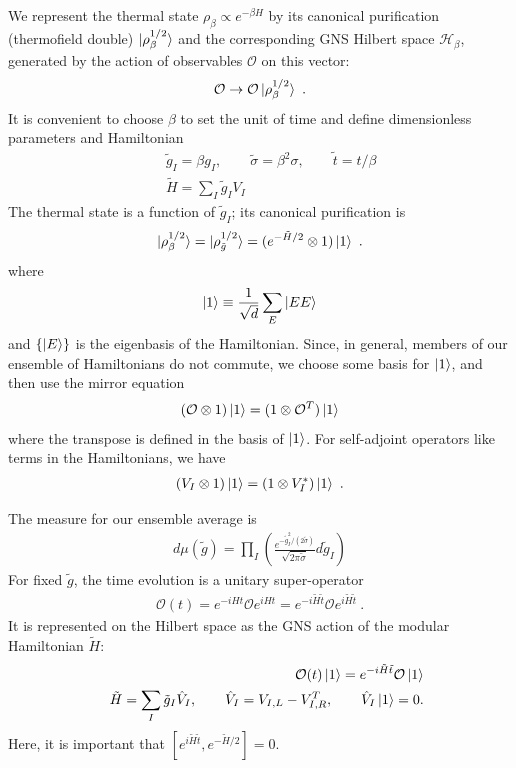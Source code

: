 \documentclass{article}
\theoremstyle{definition}
\newcommand{\nn}{\nonumber}
\newcommand{\lb}{\left(}
\newcommand{\rb}{\right)}
\newcommand{\mO}{\mathcal{O}}
\begin{document}
    We represent the thermal state $\rho_{\beta}\propto e^{-\beta H}$ by its canonical
    purification (thermofield double) $\ket{\rho_\beta^{1/2}}$ and the corresponding
    GNS Hilbert space $\mathcal{H}_{\beta}$, generated by the action of
    observables $\mO$ on this vector:
    \begin{eqnarray}
        \mO\to \mO\ket{\rho_\beta^{1/2}}\ .
    \end{eqnarray}
    It is convenient to choose $\beta$ to set the unit of time and define dimensionless
    parameters and Hamiltonian
    \begin{eqnarray}
        &&\tilde{g}_I=\beta g_I,\qquad \tilde{\sigma}=\beta^2 \sigma, \qquad
        \tilde{t}=t/\beta\nn\\
        &&\tilde{H}=\sum_I \tilde{g}_I V_I
    \end{eqnarray}
    The thermal state is a function of $\tilde{g}_{I}$; its canonical
    purification is
    \begin{eqnarray}
        \ket{\rho_\beta^{1/2}}=\ket{\rho_{\tilde{g}}^{1/2}}=(e^{-\tilde{H}/2}\otimes
        1)\ket{1}\ .
    \end{eqnarray}
    where
    \begin{eqnarray}
        \ket{1}\equiv \frac{1}{\sqrt{d}}\sum_E \ket{E E}
    \end{eqnarray}
    and $\{\ket{E}\}$ is the eigenbasis of the Hamiltonian. Since, in general, members
    of our ensemble of Hamiltonians do not commute, we choose some basis for
    $\ket{1}$, and then use the mirror equation
    \begin{eqnarray}
        (\mathcal{O}\otimes 1)\ket{1}=(1\otimes \mathcal{O}^T)\ket{1}
    \end{eqnarray}
    where the transpose is defined in the basis of $\ket{1}$. For self-adjoint
    operators like terms in the Hamiltonians, we have
    \begin{eqnarray}
        (V_I\otimes 1)\ket{1}=(1\otimes V_I^*)\ket{1}\ .
    \end{eqnarray}

    The measure for our ensemble average is
    \begin{eqnarray}
        d\mu(\tilde{g})=\prod_I\lb
        \frac{e^{-\tilde{g}_I^2/(2\tilde{\sigma})}}{\sqrt{2\pi\tilde{\sigma}}} d\tilde{g}_I\rb
    \end{eqnarray}
    For fixed $\tilde{g}$, the time evolution is a unitary super-operator
    \begin{eqnarray}
        \mO(t)=e^{-i H t}\mO e^{i H t}=e^{-i \tilde{H}\tilde{t}} \mO e^{i\tilde{H}\tilde{t}}\ .
    \end{eqnarray}
    It is represented on the Hilbert space as the GNS action of the modular Hamiltonian
    $\tilde{H}$:
    \begin{eqnarray}
        &&\mO(t)\ket{1}=e^{-i \tilde{H} \tilde{t}}\mO\ket{1}\nn\\
        &&\tilde{H}=\sum_I \tilde{g}_I \hat{V}_{I},\qquad \hat{V}_I=V_{I,L}-V^T_{I,R},\qquad
        \hat{V}_I\ket{1}=0.
    \end{eqnarray}
    Here, it is important that $[e^{i \tilde{H} \tilde{t}},e^{-\tilde{H}/2}]=0$.
\end{document}
